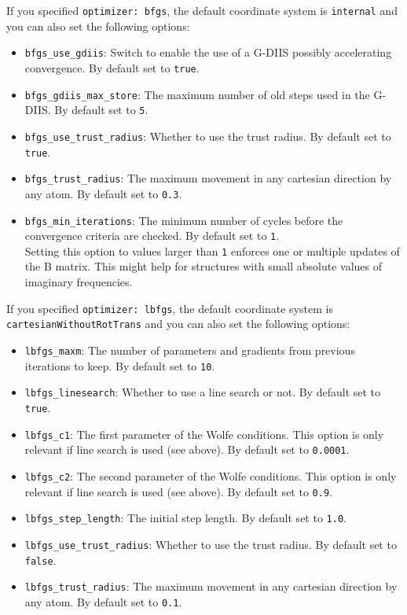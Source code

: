 \documentclass[]{tufte-book}
\begin{document}
If you specified \texttt{optimizer: bfgs}, the default coordinate system is \texttt{internal}
and you can also set the following options:
\begin{itemize}
\item \texttt{bfgs\_use\_gdiis}: Switch to enable the use of a G-DIIS possibly accelerating convergence. By default set to
\texttt{true}.
\item \texttt{bfgs\_gdiis\_max\_store}: The maximum number of old steps used in the G-DIIS. By default set to \texttt{5}.
\item \texttt{bfgs\_use\_trust\_radius}: Whether to use the trust radius. By default set to \texttt{true}.
\item \texttt{bfgs\_trust\_radius}: The maximum movement in any cartesian direction by any atom. By default set to \texttt{0.3}.
\item \texttt{bfgs\_min\_iterations}: The minimum number of cycles before the convergence criteria are checked.
By default set to \texttt{1}.\\
Setting this option to values larger than \texttt{1} enforces one or multiple updates of the B matrix.
This might help for structures with small absolute values of imaginary frequencies.
\end{itemize}

If you specified \texttt{optimizer: lbfgs}, the default coordinate system is \texttt{cartesianWithoutRotTrans}
and you can also set the following options:
\begin{itemize}
\item \texttt{lbfgs\_maxm}: The number of parameters and gradients from previous iterations to keep. By default set to
\texttt{10}.
\item \texttt{lbfgs\_linesearch}: Whether to use a line search or not. By default set to \texttt{true}.
\item \texttt{lbfgs\_c1}: The first parameter of the Wolfe conditions. This option is only relevant if line search is
used (see above). By default set to \texttt{0.0001}.
\item \texttt{lbfgs\_c2}:  The second parameter of the Wolfe conditions. This option is only relevant if line search is
used (see above). By default set to \texttt{0.9}.
\item \texttt{lbfgs\_step\_length}: The initial step length. By default set to \texttt{1.0}.
\item \texttt{lbfgs\_use\_trust\_radius}: Whether to use the trust radius. By default set to \texttt{false}.
\item \texttt{lbfgs\_trust\_radius}: The maximum movement in any cartesian direction by any atom. By default set to \texttt{0.1}.
\end{itemize}
\end{document}
